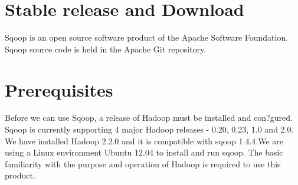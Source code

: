 \documentclass[letterpaper,10pt,english]{sphinxmanual}
\begin{document}
\section{Stable release and Download}
\label{sqoop:stable-release-and-download}
Sqoop is an open source software product of the Apache Software Foundation.
Sqoop source code is held in the Apache Git repository.


\section{Prerequisites}
\label{sqoop:prerequisites}
Before we can use Sqoop, a release of Hadoop must be installed and con?gured. Sqoop is currently supporting 4 major Hadoop releases - 0.20, 0.23, 1.0 and 2.0. We have installed Hadoop 2.2.0 and it is compatible with sqoop 1.4.4.We are using a Linux environment Ubuntu 12.04 to install and run sqoop. The basic familiarity with the purpose and operation of Hadoop is required to use this product.
\end{document}
